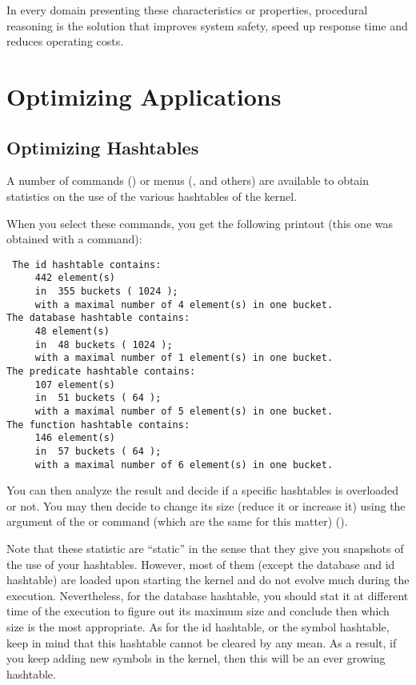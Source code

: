 In every domain presenting these characteristics or properties,
procedural reasoning is the solution that improves system safety, speed
up response time and reduces operating costs.


\chapter{Optimizing \aCOPRS{} Applications}



\section{Optimizing Hashtables}

A number of commands () or menus
(, and others) are available to obtain statistics on
the use of the various hashtables of the kernel.

When you select these commands, you get the following printout (this one
was obtained with a  command):

\begin{verbatim}
 The id hashtable contains:
     442 element(s)
     in  355 buckets ( 1024 );
     with a maximal number of 4 element(s) in one bucket.
The database hashtable contains:
     48 element(s)
     in  48 buckets ( 1024 );
     with a maximal number of 1 element(s) in one bucket.
The predicate hashtable contains:
     107 element(s)
     in  51 buckets ( 64 );
     with a maximal number of 5 element(s) in one bucket.
The function hashtable contains:
     146 element(s)
     in  57 buckets ( 64 );
     with a maximal number of 6 element(s) in one bucket.
\end{verbatim}

You can then analyze the result and decide if a specific hashtables is
overloaded or not. You may then decide to change its size (reduce it or
increase it) using the argument of the  or  command
(which are the same for this matter) ().

Note that these statistic are ``static'' in the sense that they give you
snapshots of the use of your hashtables. However, most of them (except the
database and id hashtable) are loaded upon starting the kernel and do not
evolve much during the execution. Nevertheless, for the database hashtable, you
should stat it at different time of the execution to figure out its maximum
size and conclude then which size is the most appropriate. As for the id
hashtable, or the symbol hashtable, keep in mind that this hashtable cannot be
cleared by any mean. As a result, if you keep adding new symbols in the kernel,
then this will be an ever growing hashtable.

